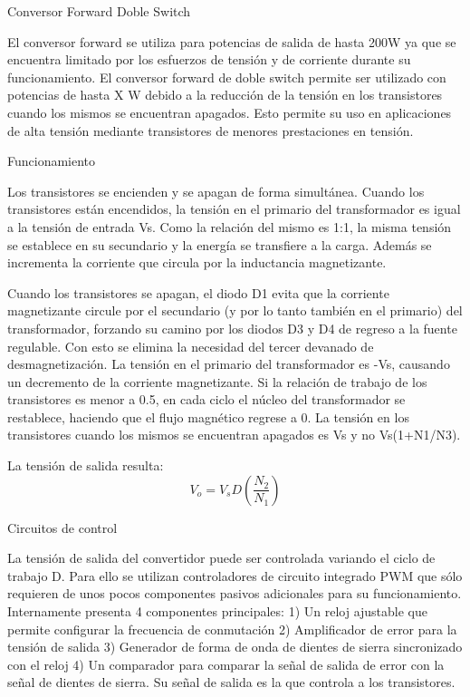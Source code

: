 Conversor Forward Doble Switch

El conversor forward se utiliza para potencias de salida de hasta 200W ya que se encuentra limitado 
por los esfuerzos de tensión y de corriente durante su funcionamiento. 
El conversor forward de doble switch permite ser utilizado con potencias de hasta X W debido a la 
reducción de la tensión en los transistores cuando los mismos se encuentran apagados. 
Esto permite su uso en aplicaciones de alta tensión mediante transistores de menores prestaciones en tensión. 

Funcionamiento 

Los transistores se encienden y se apagan de forma simultánea. 
Cuando los transistores están encendidos, la tensión en el primario del transformador es igual a la tensión de entrada Vs. 
Como la relación del mismo es 1:1, la misma tensión se establece en su secundario y la energía se transfiere a la carga. 
Además se incrementa la corriente que circula por la inductancia magnetizante. 

Cuando los transistores se apagan, el diodo D1 evita que la corriente magnetizante circule por el secundario 
(y por lo tanto también en el primario) del transformador, forzando su camino por los diodos D3 y D4 de regreso a la fuente regulable.  
Con esto se elimina la necesidad del tercer devanado de desmagnetización. 
La tensión en el primario del transformador es -Vs, causando un decremento de la corriente magnetizante. 
Si la relación de trabajo de los transistores es menor a 0.5, en cada ciclo el núcleo del transformador se restablece, 
haciendo que el flujo magnético regrese a 0. 
La tensión en los transistores cuando los mismos se encuentran apagados es Vs y no Vs(1+N1/N3).

La tensión de salida resulta:
$$ V_{o}=V_{s}D(\frac{N_{2}}{N_{1}}) $$




Circuitos de control

La tensión de salida del convertidor puede ser controlada variando el ciclo de trabajo D. 
Para ello se utilizan controladores de circuito integrado PWM que sólo requieren de unos pocos componentes pasivos adicionales para su funcionamiento. 
Internamente presenta 4 componentes principales:
1) Un reloj ajustable que permite configurar la frecuencia de conmutación 
2) Amplificador de error para la tensión de salida
3) Generador de forma de onda de dientes de sierra sincronizado con el reloj
4) Un comparador para comparar la señal de salida de error con la señal de dientes de sierra.
Su señal de salida es la que controla a los transistores. 

